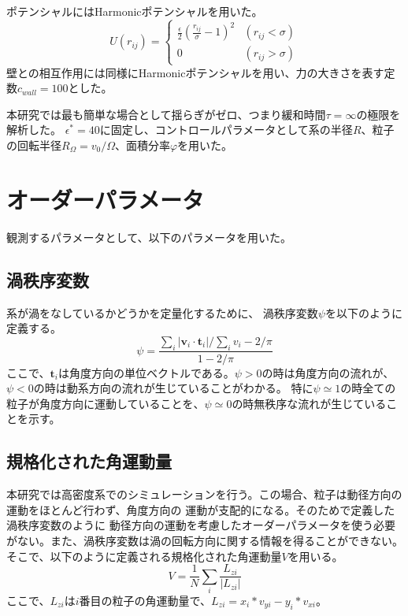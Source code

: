 \documentclass[/Users/ikedahajime/GitHub/reserch/master_report/thesis]{subfiles}
\begin{document}
ポテンシャルにはHarmonicポテンシャルを用いた。
\begin{equation}
    U(r_{ij})=
    \begin{cases}
        \frac{\epsilon}{2}\left(\frac{r_{ij}}{\sigma}-1\right)^2 &(r_{ij}<\sigma)\\
        0 & (r_{ij}>\sigma)

    \end{cases}
\end{equation}
壁との相互作用には同様にHarmonicポテンシャルを用い、力の大きさを表す定数$c_{wall}=100$とした。


本研究では最も簡単な場合として揺らぎがゼロ、つまり緩和時間$\tau=\infty$の極限を解析した。
$\epsilon^*=40$に固定し、コントロールパラメータとして系の半径$R$、粒子の回転半径$R_\Omega=v_0/\Omega$、面積分率$\varphi$を用いた。


\section{オーダーパラメータ}
観測するパラメータとして、以下のパラメータを用いた。
\subsection{渦秩序変数}\label{subsec:vortes_order_parameter}
系が渦をなしているかどうかを定量化するために、
渦秩序変数$\psi$\cite{wiolandConfinementStabilizesBacterial2013}を以下のように定義する。
\begin{equation}
    \psi=\frac{\sum_i \left|\bm{v}_i\cdot \bm{t}_i \right|/\sum_i v_i -2/\pi}{1-2/\pi}
\end{equation}
ここで、$\bm{t}_i$は角度方向の単位ベクトルである。$\psi>0$の時は角度方向の流れが、$\psi<0$の時は動系方向の流れが生じていることがわかる。
特に$\psi\simeq1$の時全ての粒子が角度方向に運動していることを、$\psi\simeq0$の時無秩序な流れが生じていることを示す。


\subsection{規格化された角運動量}
本研究では高密度系でのシミュレーションを行う。この場合、粒子は動径方向の運動をほとんど行わず、角度方向の
運動が支配的になる。そのためで定義した渦秩序変数のように
動径方向の運動を考慮したオーダーパラメータを使う必要がない。また、渦秩序変数は渦の回転方向に関する情報を得ることができない。
そこで、以下のように定義される規格化された角運動量$V$\cite{jiangEmergenceCollectiveDynamical2017,capriniCollectiveEffectsConfined2021}を用いる。
\begin{equation}
    V=\frac{1}{N} \sum_i \frac{L_{zi}}{ |L_{zi}|}
\end{equation}
ここで、$L_{zi}$は$i$番目の粒子の角運動量で、$L_{zi}=x_i*v_{yi}-y_i*v_{xi}$。
\end{document}

